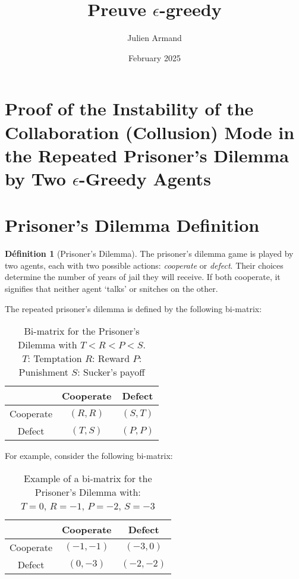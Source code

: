 \documentclass{article}
\title{Preuve \(\epsilon\)-greedy}
\author{Julien Armand}
\date{February 2025}
\theoremstyle{definition}
\newtheorem{definition}{Définition}
\begin{document}

\section{Proof of the Instability of the Collaboration (Collusion) Mode in the Repeated Prisoner's Dilemma by Two \(\epsilon\)-Greedy Agents}

\section{Prisoner's Dilemma Definition}

\begin{definition}[Prisoner's Dilemma]
The prisoner's dilemma game is played by two agents, each with two possible actions: \emph{cooperate} or \emph{defect}. Their choices determine the number of years of jail they will receive. If both cooperate, it signifies that neither agent \textquoteleft talks\textquoteright{} or snitches on the other.

The repeated prisoner's dilemma is defined by the following bi-matrix:
\end{definition}

\begin{table}[h]
    \centering
    \begin{tabular}{c|cc}
       & Cooperate & Defect \\
      \hline
      Cooperate & \((R, R)\) & \((S, T)\) \\
      Defect    & \((T, S)\) & \((P, P)\) \\
    \end{tabular}
    \caption{Bi-matrix for the Prisoner's Dilemma with \(T < R < P < S\).\\
    \(T\): Temptation \quad \(R\): Reward \quad \(P\): Punishment \quad \(S\): Sucker's payoff}
    \label{tab:prisoners_dilemma_general}
\end{table}


For example, consider the following bi-matrix:


\begin{table}[h]
    \centering
    \begin{tabular}{c|cc}
       & Cooperate & Defect \\
      \hline
      Cooperate & \((-1, -1)\) & \((-3, 0)\) \\
      Defect    & \((0, -3)\) & \((-2, -2)\) \\
    \end{tabular}
    \caption{Example of a bi-matrix for the Prisoner's Dilemma with: \\
    \(T = 0\), \quad \(R = -1\), \quad \(P = -2\), \quad \(S = -3\)}
    \label{tab:prisoners_dilemma_example}
\end{table}
\end{document}
